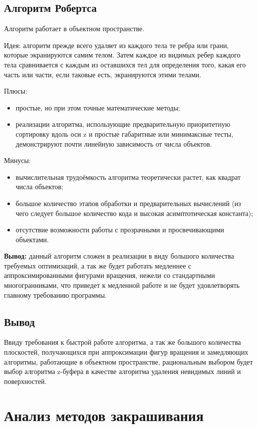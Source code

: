 \subsection{Алгоритм Робертса}
Алгоритм работает в объектном пространстве. 

Идея: алгоритм прежде всего удаляет из каждого тела те ребра или грани, которые экранируются самим телом. Затем каждое из видимых ребер каждого тела сравнивается с каждым из оставшихся тел для определения того, какая его часть или части, если таковые есть, экранируются этими телами. 

Плюсы:
\begin{itemize}
    \item простые, но при этом точные математические методы;
    \item реализации алгоритма, использующие предварительную приоритетную сортировку вдоль оси z и простые габаритные или минимаксные тесты, демонстрируют почти линейную зависимость от числа объектов.
\end{itemize}

Минусы:
\begin{itemize}
    \item вычислительная трудоёмкость алгоритма теоретически растет, как квадрат числа объектов;
    \item большое количество этапов обработки и предварительных вычислений (из чего следует большое количество кода и высокая асимптотическая константа);
    \item отсутствие возможности работы с прозрачными и просвечивающими объектами.
\end{itemize}

\textbf{Вывод:} данный алгоритм сложен в реализации в виду большого количества требуемых оптимизаций, а так же будет работать медленнее с аппроксимированными фигурами вращения, нежели со стандартными многогранниками, что приведет к медленной работе и не будет удовлетворять главному требованию программы.

\subsection*{Вывод}
Ввиду требования к быстрой работе алгоритма, а так же большого количества плоскостей, получающихся при аппроксимации фигур вращения и замедляющих алгоритмы, работающие в объектном пространстве, рациональным выбором будет выбор алгоритма z-буфера в качестве алгоритма удаления невидимых линий и поверхностей.


\section{Анализ методов закрашивания}

